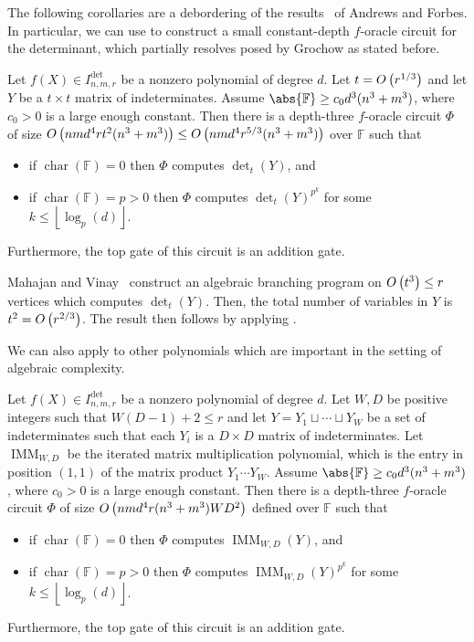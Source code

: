 \documentclass[10pt,a4paper]{amsart}
\DeclareMathOperator{\characteristic}{char}
\DeclareMathOperator{\IMM}{IMM}
\newcommand*\F{\mathbb{F}}
\newcommand*\floor[1]{%
    \left\lfloor #1 \right\rfloor
}
\newcommand*\bigO[1]{%
    O\kern-0.0pt\left(#1\right)
}
\begin{document}
The following corollaries are a debordering of the results~\cite[Corollary 3.9, Corollary 3.10]{AF21} of Andrews and Forbes.
In particular, we can use  to construct a small constant-depth $f$-oracle circuit for the determinant, which partially resolves  posed by Grochow as stated before.
\begin{cor}\label{cor:det_oracle_for_det}
    Let $f(X) \in I^{\det}_{n, m, r}$ be a nonzero polynomial of degree $d$.
    Let $t=\bigO{r^{1/3}}$ and let $Y$ be a $t \times t$ matrix of indeterminates.
    Assume $\abs{\F} \geq c_0 d^3(n^3+m^3)$, where $c_0>0$ is a large enough constant. 
    Then there is a depth-three $f$-oracle circuit $\Phi$ of size $\bigO{n m d^4 r t^2 (n^3+m^3)} \leq \bigO{n m d^4 r^{5/3} (n^3+m^3)}$ over $\F$ such that 
    \begin{itemize}
        \item if $\characteristic(\F) = 0$ then $\Phi$ computes $\det_t(Y)$, and
        \item if $\characteristic(\F) = p > 0$ then $\Phi$ computes $\det_t(Y)^{p^k}$ for some $k \leq \floor{\log_p(d)}$.
    \end{itemize}
    Furthermore, the top gate of this circuit is an addition gate.
\end{cor}
\begin{pf}
    Mahajan and Vinay~\cite[Theorem 2]{MV97} construct an algebraic branching program on $\bigO{t^3} \leq r$ vertices which computes $\det_t(Y)$.
    Then, the total number of variables in $Y$ is $t^2 = \bigO{r^{2 / 3}}$.
    The result then follows by applying .
\end{pf}
We can also apply  to other polynomials which are important in the setting of algebraic complexity.
\begin{cor}\label{cor:det_oracle_for_IMM}
    Let $f(X) \in I^{\det}_{n, m, r}$ be a nonzero polynomial of degree $d$.
    Let $W, D$ be positive integers such that $W(D - 1) + 2 \leq r$ and let $Y = Y_1 \sqcup \cdots \sqcup Y_W$ be a set of indeterminates such that each $Y_i$ is a $D \times D$ matrix of indeterminates.
    Let $\IMM_{W, D}$ be the iterated matrix multiplication polynomial, which is the entry in position $(1, 1)$ of the matrix product $Y_1 \cdots Y_W$.
    Assume $\abs{\F} \geq c_0 d^3(n^3+m^3)$, where $c_0>0$ is a large enough constant.
    Then there is a depth-three $f$-oracle circuit $\Phi$ of size $\bigO{nmd^4 r(n^3+m^3) W D^2}$ defined over $\F$ such that 
    \begin{itemize}
        \item if $\characteristic(\F) = 0$ then $\Phi$ computes $\IMM_{W, D}(Y)$, and
        \item if $\characteristic(\F) = p > 0$ then $\Phi$ computes $\IMM_{W, D}(Y)^{p^k}$ for some $k \leq \floor{\log_p(d)}$.
    \end{itemize}
    Furthermore, the top gate of this circuit is an addition gate.
\end{cor}
\end{document}
